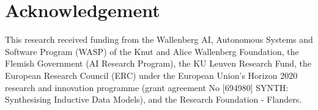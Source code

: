 \documentclass[final]{elsarticle}
\numberwithin{equation}{section}
\begin{document}




\section*{Acknowledgement}

This research received funding from the Wallenberg AI, Autonomous Systems and Software Program (WASP) of the Knut and Alice Wallenberg Foundation, the Flemish Government (AI Research Program),
the KU Leuven Research Fund, the European Research Council (ERC) under the European Union’s Horizon 2020 research and innovation programme (grant agreement No [694980] SYNTH: Synthesising Inductive Data Models), and
the Research Foundation - Flanders.




\newpage
\clearpage

\appendix




% 

% 

% 


\setcounter{section}{0}
\renewcommand{\thesection}{\Alph{section}}
\renewcommand{\theequation}{\Alph{section}.\arabic{equation}}
\renewcommand{\thetheorem}{\Alph{section}.\arabic{theorem}}
\renewcommand{\thedefinition}{\Alph{section}.\arabic{definition}}











% 



% 

% 

\
\end{document}
